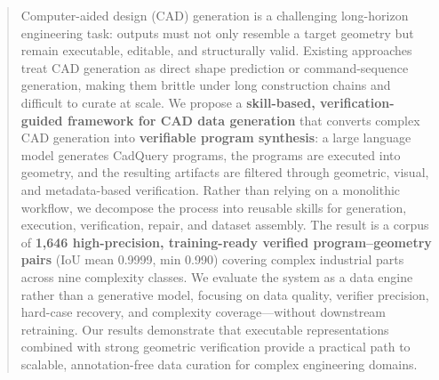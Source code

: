 \begin{abstract}
Computer-aided design (CAD) generation is a challenging long-horizon engineering task: outputs must not only resemble a target geometry but remain executable, editable, and structurally valid.
Existing approaches treat CAD generation as direct shape prediction or command-sequence generation, making them brittle under long construction chains and difficult to curate at scale.
We propose a \textbf{skill-based, verification-guided framework for CAD data generation} that converts complex CAD generation into \textbf{verifiable program synthesis}: a large language model generates CadQuery programs, the programs are executed into geometry, and the resulting artifacts are filtered through geometric, visual, and metadata-based verification.
Rather than relying on a monolithic workflow, we decompose the process into reusable skills for generation, execution, verification, repair, and dataset assembly.
The result is a corpus of \textbf{1,646 high-precision, training-ready verified program--geometry pairs} (IoU mean 0.9999, min 0.990) covering complex industrial parts across nine complexity classes.
We evaluate the system as a data engine rather than a generative model, focusing on data quality, verifier precision, hard-case recovery, and complexity coverage---without downstream retraining.
Our results demonstrate that executable representations combined with strong geometric verification provide a practical path to scalable, annotation-free data curation for complex engineering domains.
\end{abstract}
